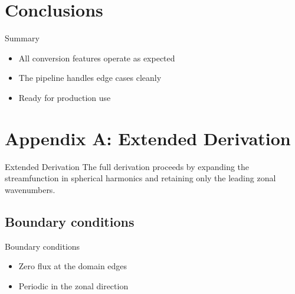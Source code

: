 \documentclass{beamer}
\begin{document}
\section{Conclusions}

\begin{frame}{Summary}
\begin{itemize}
  \item All conversion features operate as expected \citep{madden1971}
  \item The pipeline handles \alert{edge cases} cleanly
  \item Ready for production use
\end{itemize}
\end{frame}

\clearpage

\section{Appendix A: Extended Derivation}

\begin{frame}{Extended Derivation}
The full derivation proceeds by expanding the streamfunction in spherical
harmonics and retaining only the leading zonal wavenumbers.
\end{frame}

\subsection{Boundary conditions}

\begin{frame}{Boundary conditions}
\begin{itemize}
  \item Zero flux at the domain edges
  \item Periodic in the zonal direction
\end{itemize}
\end{frame}
\end{document}
